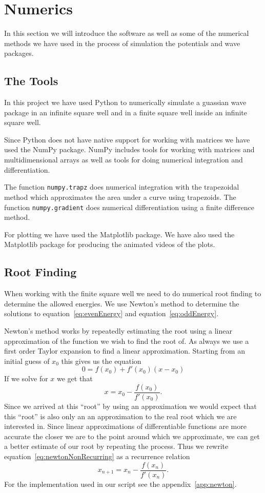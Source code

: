 \documentclass[12pt,a4paper]{article}
\begin{document}
\section{Numerics}
In this section we will introduce the software as well as some of the numerical methods we have used in the process of simulation the potentials and wave packages.

\subsection{The Tools}
In this project we have used Python to numerically simulate a guassian wave package in an infinite square well and in a finite square well inside an infinite square well.

Since Python does not have native support for working with matrices we have used the NumPy package. NumPy includes tools for working with matrices and multidimensional arrays as well as tools for doing numerical integration and differentiation.

The function \lstinline{numpy.trapz} does numerical integration with the trapezoidal method which approximates the area under a curve using trapezoids. The function \lstinline{numpy.gradient} does numerical differentiation using a finite difference method.

For plotting we have used the Matplotlib package. We have also used the Matplotlib package for producing the animated videos of the plots.

\subsection{Root Finding}
When working with the finite square well we need to do numerical root finding to determine the allowed energies. We use Newton's method to determine the solutions to equation~\eqref{eq:evenEnergy} and equation~\eqref{eq:oddEnergy}.

Newton's method works by repeatedly estimating the root using a linear approximation of the function we wish to find the root of. As always we use a first order Taylor expansion to find a linear approximation. Starting from an initial guess of $x_0$ this gives us the equation
\begin{equation}
0 = f(x_0) + f'(x_0)(x - x_0)
\end{equation}
If we solve for $x$ we get that
\begin{equation}
x = x_0 - \frac{f(x_0)}{f'(x_0)}. \label{eq:newtonNonRecurring}
\end{equation}
Since we arrived at this ``root'' by using an approximation we would expect that this ``root'' is also only an an approximation to the real root which we are interested in. Since linear approximations of differentiable functions are more accurate the closer we are to the point around which we approximate, we can get a better estimate of our root by repeating the process. Thus we rewrite equation~\eqref{eq:newtonNonRecurring} as a recurrence relation
\begin{equation}
x_{n+1} = x_n - \frac{f(x_n)}{f'(x_n)}.
\end{equation}
For the implementation used in our script see the appendix~\ref{app:newton}.
\end{document}
